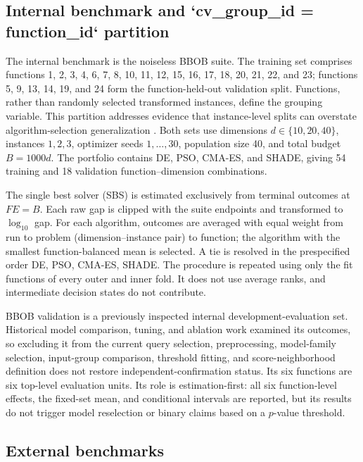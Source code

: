 \subsection{Internal benchmark and `cv_group_id = function_id` partition}

The internal benchmark is the noiseless BBOB suite.  The training set comprises
functions 1, 2, 3, 4, 6, 7, 8, 10, 11, 12, 15, 16, 17, 18, 20, 21, 22, and 23;
functions 5, 9, 13, 14, 19, and 24 form the function-held-out validation split.  Functions,
rather than randomly selected transformed instances, define the grouping
variable.  This partition addresses evidence that instance-level splits can
overstate algorithm-selection generalization
\cite{cenikjLandscapeFeaturesSingleobjective2025}.  Both sets use dimensions
$d\in\{10,20,40\}$, instances $1,2,3$, optimizer seeds $1,\ldots,30$, population
size 40, and total budget $B=1000d$.  The portfolio contains DE, PSO, CMA-ES,
and SHADE, giving 54 training and 18 validation function--dimension
combinations.

The single best solver (SBS) is estimated exclusively from terminal outcomes at
$FE=B$.  Each raw gap is clipped with the suite endpoints and transformed to
$\log_{10}$ gap.  For each algorithm, outcomes are averaged with equal weight
from run to problem (dimension--instance pair) to function; the algorithm with
the smallest function-balanced mean is selected.  A tie is resolved in the
prespecified order DE, PSO, CMA-ES, SHADE.  The procedure is repeated using only
the fit functions of every outer and inner fold.  It does not use average ranks,
and intermediate decision states do not contribute.

BBOB validation is a previously inspected internal development-evaluation set.
Historical model comparison, tuning, and ablation work examined its outcomes,
so excluding it from the current query selection, preprocessing, model-family
selection, input-group comparison, threshold fitting, and score-neighborhood
definition does not restore independent-confirmation status.  Its six
functions are six top-level evaluation units.  Its role is estimation-first:
all six function-level effects, the fixed-set mean, and conditional intervals
are reported, but its results do not trigger model reselection or binary claims
based on a $p$-value threshold.

\subsection{External benchmarks}

